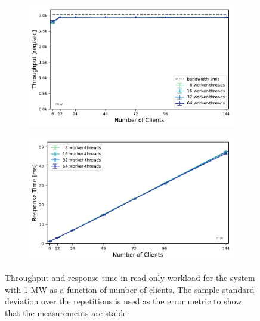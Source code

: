 \documentclass[report.tex]{subfiles}
\begin{document}
\begin{figure}[H]
	\begin{subfigure}[b]{.499\linewidth}
		\centering
		\includegraphics[width=\linewidth]{data/exp31_ro_tp_nc_w.pdf}
	\end{subfigure}\hfill
	\begin{subfigure}[b]{.499\linewidth}
		\centering
		\includegraphics[width=\linewidth]{data/exp31_ro_rt_nc_w.pdf}
	\end{subfigure}%
	\caption{Throughput and response time in read-only workload for the system with 1 MW as a function of number of clients. The sample standard deviation over the repetitions is used as the error metric to show that the measurements are stable.}\label{exp31_ro_tp_nc}
\end{figure}
\end{document}

